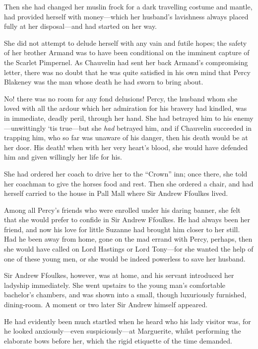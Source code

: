 \documentclass[paper=a5,BCOR=7mm,twoside,DIV=calc,12pt,usegeometry,chapterprefix,endperiod,headings=big]{scrbook}
\begin{document}
Then she had changed her muslin frock for a dark travelling costume and mantle, had provided herself with money---which her husband's lavishness always placed fully at her disposal---and had started on her way.

She did not attempt to delude herself with any vain and futile hopes; the safety of her brother Armand was to have been conditional on the imminent capture of the Scarlet Pimpernel. As Chauvelin had sent her back Armand's compromising letter, there was no doubt that he was quite satisfied in his own mind that Percy Blakeney was the man whose death he had sworn to bring about.

No! there was no room for any fond delusions! Percy, the husband whom she loved with all the ardour which her admiration for his bravery had kindled, was in immediate, deadly peril, through her hand. She had betrayed him to his enemy---unwittingly `tis true---but she \textit{had} betrayed him, and if Chauvelin succeeded in trapping him, who so far was unaware of his danger, then his death would be at her door. His death! when with her very heart's blood, she would have defended him and given willingly her life for his.

She had ordered her coach to drive her to the \enquote{Crown} inn; once there, she told her coachman to give the horses food and rest. Then she ordered a chair, and had herself carried to the house in Pall Mall where Sir Andrew Ffoulkes lived.

Among all Percy's friends who were enrolled under his daring banner, she felt that she would prefer to confide in Sir Andrew Ffoulkes. He had always been her friend, and now his love for little Suzanne had brought him closer to her still. Had he been away from home, gone on the mad errand with Percy, perhaps, then she would have called on Lord Hastings or Lord Tony---for she wanted the help of one of these young men, or she would be indeed powerless to save her husband.

Sir Andrew Ffoulkes, however, was at home, and his servant introduced her ladyship immediately. She went upstairs to the young man's comfortable bachelor's chambers, and was shown into a small, though luxuriously furnished, dining-room. A moment or two later Sir Andrew himself appeared.

He had evidently been much startled when he heard who his lady visitor was, for he looked anxiously---even suspiciously---at Marguerite, whilst performing the elaborate bows before her, which the rigid etiquette of the time demanded.
\end{document}
